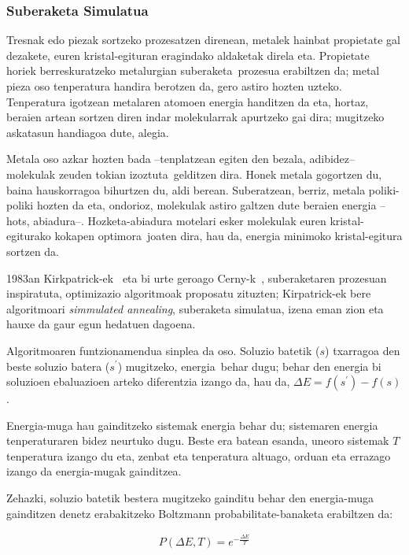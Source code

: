 \documentclass[eu]{ifirak}\usepackage[]{graphicx}\usepackage[]{color}
\newcommand{\zkk}{\guillemotleft}
\newcommand{\skk}{\guillemotright}
\begin{document}
\subsubsection{Suberaketa Simulatua}

Tresnak edo piezak sortzeko prozesatzen direnean, metalek hainbat propietate gal dezakete, euren kristal-egituran eragindako aldaketak direla eta. Propietate horiek berreskuratzeko metalurgian \zkk suberaketa\skk\ prozesua erabiltzen da; metal pieza oso tenperatura handira berotzen da, gero astiro hozten uzteko. Tenperatura igotzean metalaren atomoen energia handitzen da eta, hortaz, beraien artean sortzen diren indar molekularrak apurtzeko gai dira; mugitzeko askatasun handiagoa dute, alegia. 

Metala oso azkar hozten bada --tenplatzean egiten den bezala, adibidez-- molekulak zeuden tokian \zkk izoztuta\skk\ gelditzen dira. Honek metala gogortzen du, baina hauskorragoa bihurtzen du, aldi berean. Suberatzean, berriz, metala poliki-poliki hozten da eta, ondorioz, molekulak astiro galtzen dute beraien energia --hots, abiadura--. Hozketa-abiadura motelari esker molekulak euren kristal-egiturako \zkk kokapen optimora\skk\ joaten dira, hau da, energia minimoko kristal-egitura sortzen da.

1983an Kirkpatrick-ek~\cite{kirkpatrick1983} eta bi urte geroago Cerny-k~\cite{cerny1985}, suberaketaren prozesuan inspiratuta, optimizazio algoritmoak proposatu zituzten; Kirpatrick-ek bere algoritmoari \textit{simmulated annealing}, suberaketa simulatua, izena eman zion eta hauxe da gaur egun hedatuen dagoena.

Algoritmoaren funtzionamendua sinplea da oso. Soluzio batetik ($s$) txarragoa den beste soluzio batera ($s^\prime$) mugitzeko, \zkk energia\skk\ behar dugu; behar den energia bi soluzioen ebaluazioen arteko diferentzia izango da, hau da, $\Delta E = f(s^\prime) - f(s)$. 

Energia-muga hau gainditzeko sistemak energia behar du; sistemaren energia \zkk tenperatura\skk ren bidez neurtuko dugu. Beste era batean esanda, uneoro sistemak $T$ tenperatura izango du eta, zenbat eta tenperatura altuago, orduan eta errazago izango da energia-mugak gainditzea.

Zehazki, soluzio batetik bestera mugitzeko gainditu behar den energia-muga gainditzen denetz erabakitzeko Boltzmann probabilitate-banaketa erabiltzen da:

\begin{align*}
P(\Delta E, T) = e^{-\frac{\Delta E}{T}}
\end{align*}
\end{document}
